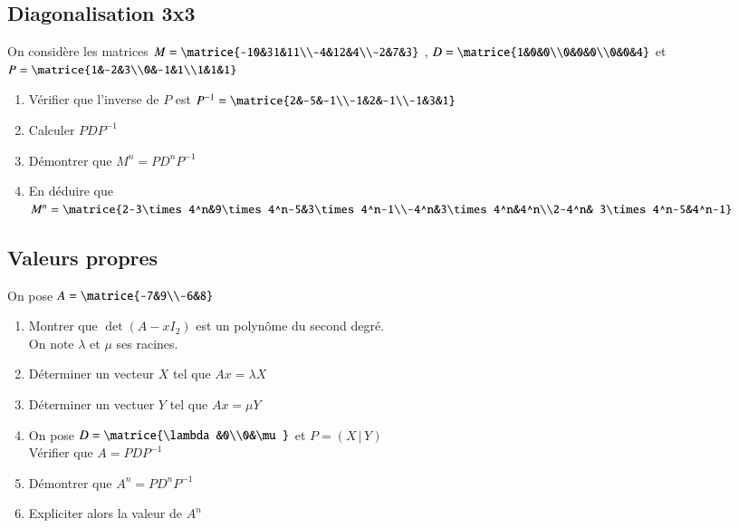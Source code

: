 \documentclass[oneside,12pt]{article}          %
\begin{document}
\subsection{Diagonalisation 3x3}
On considère les matrices $M=\matrice{-10&31&11\\-4&12&4\\-2&7&3} $ , $D=\matrice{1&0&0\\0&0&0\\0&0&4} $ et $P=\matrice{1&-2&3\\0&-1&1\\1&1&1} $
\begin{enumerate}
    \item Vérifier que l'inverse de $P$ est $P^{-1}=\matrice{2&-5&-1\\-1&2&-1\\-1&3&1} $
    \item Calculer $PDP^{-1}$
    \item Démontrer que $M^n=PD^nP^{-1}$
    \item En déduire que $M^n=\matrice{2-3\times4^n&9\times4^n-5&3\times4^n-1\\-4^n&3\times4^n&4^n\\2-4^n&  3\times4^n-5&4^n-1} $
\end{enumerate}



\subsection{Valeurs propres}
On pose $A=\matrice{-7&9\\-6&8}$
\begin{enumerate}
    \item Montrer que $\det(A-xI_2)$ est un polynôme du second degré.\\
    On note $\lambda$ et $\mu$ ses racines.
    \item Déterminer un vecteur $X$ tel que $Ax=\lambda X$
    \item Déterminer un vectuer $Y$ tel que $Ax = \mu Y$
    \item On pose $D=\matrice{\lambda&0\\0&\mu}$ et $P=(X\,|\,Y)$\\
    Vérifier que $A=PDP^{-1}$
    \item Démontrer que $A^n=PD^nP^{-1}$
    \item Expliciter alors la valeur de $A^n$
\end{enumerate}
\end{document}
